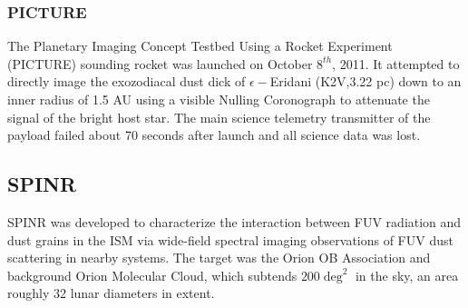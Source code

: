 \documentclass[10pt]{article}
\theoremstyle{definition}
\begin{document}
\subsubsection*{PICTURE}
The Planetary Imaging Concept Testbed Using a Rocket Experiment (PICTURE) sounding rocket was launched on October $8^{th}$, 2011. It attempted to directly image the exozodiacal dust dick of $\epsilon-$Eridani (K2V,3.22 pc) down to an inner radius of 1.5 AU using a visible Nulling Coronograph to attenuate the signal of the bright host star. The main science telemetry transmitter of the payload failed about 70 seconds after launch and all science data was lost. 
\subsection{SPINR}
SPINR was developed to characterize the interaction between FUV radiation and dust grains in the ISM via wide-field spectral imaging observations of FUV dust scattering in nearby systems. The target was the Orion OB Association and background Orion Molecular Cloud, which subtends $200 \deg^2$ in the sky, an area roughly 32 lunar diameters in extent.
\end{document}
